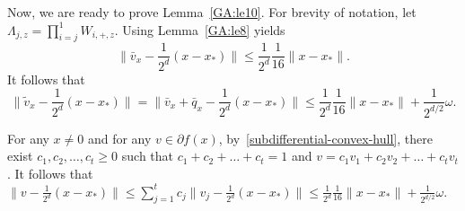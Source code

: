 \documentclass[11pt]{article}
\begin{document}
Now, we are ready to prove Lemma~\eqref{GA:le10}.
For brevity of notation, let $\Lambda_{j, z} = \prod_{i = j}^1 W_{i, +, z}$. Using Lemma~\ref{GA:le8} yields
$$
\|\bar{v}_{x} - \frac{1}{2^d} (x - x_*)\| \leq \frac{1}{2^d} \frac{1}{16} \|x - x_*\|.
$$
It follows that
$$
\|\tilde{v}_x - \frac{1}{2^d} (x - x_*)\| = \|\bar{v}_x + \bar{q}_x - \frac{1}{2^d} (x - x_*)\| \leq \frac{1}{2^d} \frac{1}{16} \|x - x_*\| + \frac{1}{2^{d/2}} \omega.
$$

For any $x \neq 0$ and for any $v \in \partial f(x)$, by~\eqref{subdifferential-convex-hull}, there exist $c_1, c_2, \ldots, c_t \geq 0$ such that $c_1 + c_2 + \ldots + c_t = 1$ and $v = c_1 v_1 + c_2 v_2 + \ldots + c_t v_t$. It follows that
$\|v - \frac{1}{2^d} (x - x_*)\| \leq \sum_{j = 1}^t c_j \|v_j - \frac{1}{2^d} (x - x_*)\| \leq \frac{1}{2^d} \frac{1}{16} \|x - x_*\| + \frac{1}{2^{d/2}} \omega$.
















\end{document}
